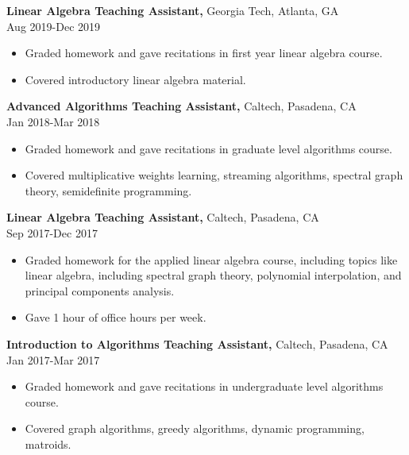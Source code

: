 \documentclass[margin]{res}
\begin{document}
\begin{resume}
{\bf Linear Algebra Teaching Assistant,} Georgia Tech, Atlanta, GA \\ Aug 2019-Dec 2019
\begin{itemize} \itemsep -2pt %
    \item Graded homework and gave recitations in first year linear algebra course.
    \item Covered introductory linear algebra material.
\end{itemize}
 
{\bf Advanced Algorithms Teaching Assistant,} Caltech, Pasadena, CA \\ Jan 2018-Mar 2018
\begin{itemize} \itemsep -2pt %
\item Graded homework and gave recitations in graduate level algorithms course.
\item Covered multiplicative weights learning, streaming algorithms,
spectral graph theory, semidefinite programming.
\end{itemize}
 
{\bf Linear Algebra Teaching Assistant,} Caltech, Pasadena, CA \\ Sep 2017-Dec 2017
\begin{itemize} \itemsep -2pt %
\item Graded homework for the applied linear algebra course, including topics like linear algebra, including spectral graph theory, polynomial
interpolation, and principal components analysis.
\item Gave 1 hour of office hours per week.
\end{itemize}
 
{\bf Introduction to Algorithms Teaching Assistant,} Caltech, Pasadena, CA \\ Jan 2017-Mar 2017
\begin{itemize} \itemsep -2pt %
\item Graded homework and gave recitations in undergraduate level algorithms course.
\item Covered graph algorithms, greedy algorithms, dynamic programming, matroids.
\end{itemize}


\end{resume}
\end{document}
